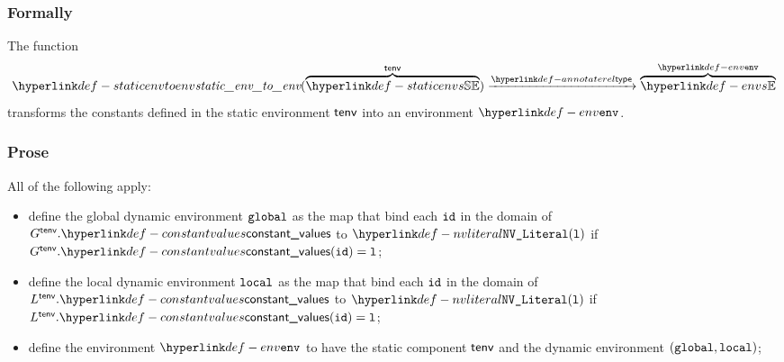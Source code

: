 \subsubsection{Formally}
\begin{mathpar}
\end{mathpar}

\begin{mathpar}
\end{mathpar}

\begin{mathpar}
\end{mathpar}

\hypertarget{def-staticenvtoenv}{}
The function
\[
  \staticenvtoenv(\overname{\staticenvs}{\tenv}) \typearrow \overname{\envs}{\env}
\]
transforms the constants defined in the static environment $\tenv$ into an environment $\env$.

\subsubsection{Prose}
All of the following apply:
\begin{itemize}
  \item define the global dynamic environment $\vglobal$ as the map that bind
        each $\id$ in the domain of $G^\tenv.\constantvalues$ to $\nvliteral{\vl}$
        if $G^\tenv.\constantvalues(\id) = \vl$;
  \item define the local dynamic environment $\vlocal$ as the map that bind
        each $\id$ in the domain of $L^\tenv.\constantvalues$ to $\nvliteral{\vl}$
        if $L^\tenv.\constantvalues(\id) = \vl$;
  \item define the environment $\env$ to have the static component $\tenv$ and the dynamic
        environment $(\vglobal, \vlocal)$;
\end{itemize}
